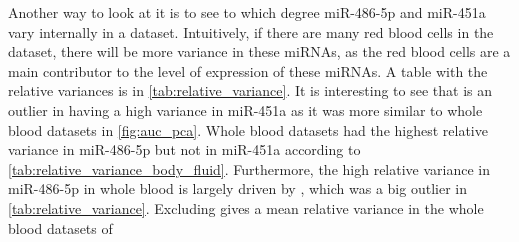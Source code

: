{{{{{{{{{{{{{{Another way to look at it is to see to which degree miR-486-5p and miR-451a vary internally in a dataset. Intuitively, if there are many red blood cells in the dataset, there will be more variance in these miRNAs, as the red blood cells are a main contributor to the level of expression of these miRNAs. A table with the relative variances is in \autoref{tab:relative_variance}. It is interesting to see that \citet{Qu2017} is an outlier in having a high variance in miR-451a as it was more similar to whole blood datasets in \autoref{fig:auc_pca}. Whole blood datasets had the highest relative variance in miR-486-5p but not in miR-451a according to \autoref{tab:relative_variance_body_fluid}. Furthermore, the high relative variance in miR-486-5p in whole blood is largely driven by \citet{Leidinger2014}, which was a big outlier in \autoref{tab:relative_variance}. Excluding \citet{Leidinger2014} gives a mean relative variance in the whole blood datasets of \py{"$%


\begin{table}
    \caption{The relative variance of miR-486-5p and miR-451a in the different datasets. The relative variance is the variance in the expression of these miRNAs, divided by the mean variance among all miRNAs.}
    \label{tab:relative_variance}
    \sisetup{round-mode=places, round-precision=3}
    \begin{center}
        \csvreader[head to column names, tabular=|r|r|r|,
        table head = \hline \bfseries Study & \bfseries miR-486-5p & \bfseries miR-451a \\\hline,
        late after line=\\, late after last line=\\\hline]{tables/RedBloodCells/relative_variance.csv}{}{
            \citet{\csvcoli} & \ifthenelse{\equal{\csvcolii}{}}{}{\num{\csvcolii}} & \ifthenelse{\equal{\csvcoliii}{}}{}{\num{\csvcoliii}}
        }
    \end{center}
\end{table}

}}}}}}}}}}}}}}}
